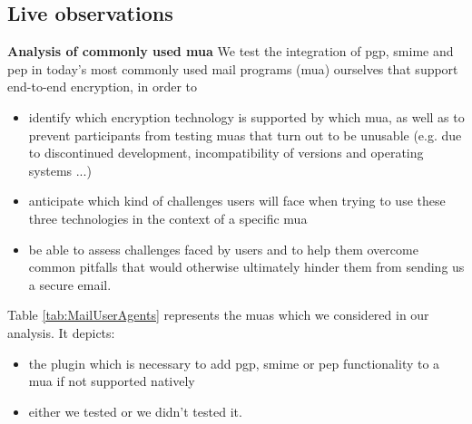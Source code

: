 \subsection{Live observations}
\textbf{\newline Analysis of commonly used \acrlong{mua}}
\newline
We test the integration of \acrshort{pgp}, \acrshort{smime} and \acrshort{pep} in today's most commonly used mail programs (\acrshort{mua}) ourselves that support end-to-end encryption, in order to
\begin{itemize}
	\item identify which encryption technology is supported by which \acrshort{mua}, as well as to prevent participants from testing \acrshort{mua}s that turn out to be unusable (e.g. due to discontinued development, incompatibility of versions and operating systems ...)
	\item anticipate which kind of challenges users will face when trying to use these three technologies in the context of a specific \acrshort{mua}
	\item be able to assess challenges faced by users and to help them overcome common pitfalls that would otherwise ultimately hinder them from sending us a secure \acrshort{email}.
\end{itemize}
Table \ref{tab:MailUserAgents} represents the \acrlong{mua}s which we considered in our analysis. It depicts:
\begin{itemize}
	\item the plugin which is necessary to add \acrshort{pgp}, \acrshort{smime} or \acrshort{pep} functionality to a \acrshort{mua} if not	supported natively
	\item either we tested or we didn't tested it.
\end{itemize}

